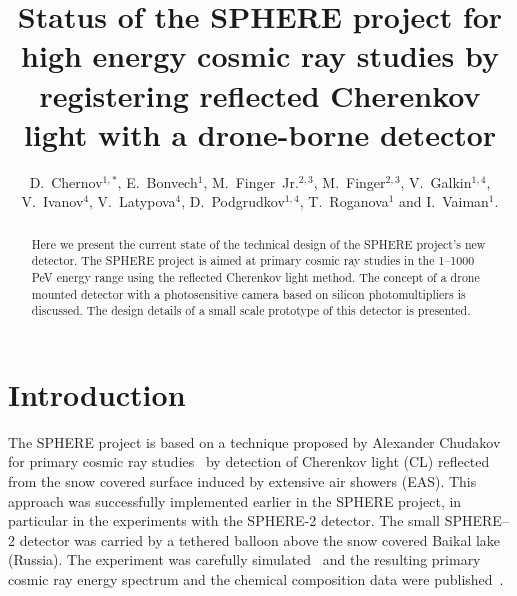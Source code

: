 \documentclass[a4paper]{jpconf}
\begin{document}
\newcommand{\todoi}[1]{\todo[inline]{\Russian #1}}

\title{Status of the SPHERE project for high energy cosmic ray studies by registering reflected Cherenkov light with a drone-borne detector}

\author[1]{D.~Chernov$^{1,\ast}$, 
E.~Bonvech$^{1}$, 
M.~Finger~Jr.$^{2,3}$, 
M.~Finger$^{2,3}$,
V.~Galkin$^{1,4}$, 
V.~Ivanov$^{4}$,
V.~Latypova$^{4}$,
D.~Podgrudkov$^{1,4}$, 
T.~Roganova$^{1}$ 
and I.~Vaiman$^{1}$.}

\address{$^1$ Lomonosov Moscow State University, Skobeltsyn Institute for Nuclear Physics, Moscow, Russian Federation}
\address{$^2$ Charles University, Faculty of Mathematics and Physics, 18000 Prague, Czech Republic}
\address{$^3$ Joint Institute for Nuclear Research, Dubna, Russian Federation}
\address{$^4$ Lomonosov Moscow State University, Faculty of Physics, Moscow, Russian Federation}


\begin{abstract}

Here we present the current state of the technical design of the SPHERE project’s new detector. The SPHERE project is aimed at primary cosmic ray studies in the 1--1000 PeV energy range using the reflected Cherenkov light method. The concept of a drone mounted detector with a photosensitive camera based on silicon photomultipliers is discussed. The design details of a small scale prototype of this detector is presented.    
\end{abstract}

\section{Introduction}
\label{sec:intro}

The SPHERE project is based on a technique proposed by Alexander Chudakov for primary cosmic ray studies~\cite{Chu74} by detection of  Cherenkov light (CL) reflected from the snow covered surface induced by extensive air showers (EAS). This approach was successfully implemented earlier in the SPHERE project\cite{Ant15a}, in particular in the experiments with the SPHERE-2 detector\cite{Ant20}. The small SPHERE--2 detector was carried by a tethered balloon above the snow covered Baikal lake (Russia). The experiment was carefully simulated~\cite{Ant19} and the resulting primary cosmic ray energy spectrum and the chemical composition data were published~\cite{Ant15c}. 
\end{document}
